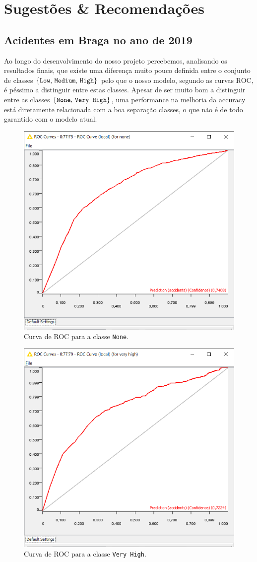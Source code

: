 \section{Sugestões \& Recomendações}

\subsection{Acidentes em Braga no ano de 2019}

Ao longo do desenvolvimento do nosso projeto percebemos, analisando os resultados finais, que existe uma diferença muito pouco definida entre o conjunto de classes $\{\mbox{\texttt{Low}, \texttt{Medium}, \texttt{High}}\}$ pelo que o nosso modelo, segundo as curvas ROC, é péssimo a distinguir entre estas classes. Apesar de ser muito bom a distinguir entre as classes $\{\mbox{\texttt{None}, \texttt{Very High}}\}$, uma performance na melhoria da accuracy está diretamente relacionada com a boa separação classes, o que não é de todo garantido com o modelo atual. 

\begin{figure}[H]
    \centering
    \includegraphics[width=0.4\linewidth]{Figures/ROC/none.png}
    \caption{Curva de ROC para a classe \texttt{None}.}
    \label{fig:ii1}
\end{figure}

\begin{figure}[H]
    \centering
    \includegraphics[width=0.4\linewidth]{Figures/ROC/very high.png}
    \caption{Curva de ROC para a classe \texttt{Very High}.}
    \label{fig:ii2}
\end{figure}

